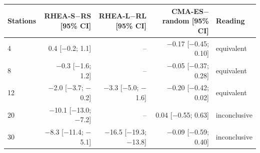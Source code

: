 \begin{tabular}{lrrrl}
\toprule
Stations & RHEA-S$-$RS [95\% CI] & RHEA-L$-$RL [95\% CI] & CMA-ES$-$random [95\% CI] & Reading \\
\midrule
4 & 0.4 [$-$0.2; 1.1] & -- & $-$0.17 [$-$0.45; 0.10] & equivalent \\
8 & $-$0.3 [$-$1.6; 1.2] & -- & $-$0.05 [$-$0.37; 0.28] & equivalent \\
12 & $-$2.0 [$-$3.7; $-$0.2] & $-$3.3 [$-$5.0; $-$1.6] & $-$0.20 [$-$0.42; 0.02] & equivalent \\
20 & $-$10.1 [$-$13.0; $-$7.2] & -- & 0.04 [$-$0.55; 0.63] & inconclusive \\
30 & $-$8.3 [$-$11.4; $-$5.1] & $-$16.5 [$-$19.3; $-$13.8] & $-$0.09 [$-$0.59; 0.40] & inconclusive \\
\bottomrule
\end{tabular}
